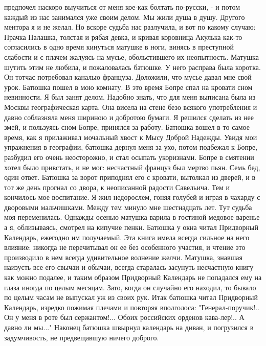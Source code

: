 предпочел наскоро выучиться от меня  кое-как  болтать  по-русски, -  и потом
каждый  из нас  занимался  уже своим делом.  Мы жили  душа  в  душу. Другого
ментора я  и  не  желал. Но вскоре судьба нас разлучила,  и  вот  по  какому
случаю:
Прачка Палашка,  толстая  и  рябая девка,  и  кривая  коровница Акулька
как-то согласились в одно время кинуться матушке в ноги, винясь в преступной
слабости и с плачем жалуясь на мусье,  обольстившего их неопытность. Матушка
шутить этим не любила, и пожаловалась батюшке. У него расправа была коротка.
Он тотчас потребовал каналью француза. Доложили,  что  мусье давал  мне свой
урок. Батюшка пошел в мою комнату. В  это время Бопре  спал  на кровати сном
невинности. Я был занят делом.  Надобно знать, что для меня выписана была из
Москвы географическая карта. Она висела на стене безо всякого употребления и
давно соблазняла меня шириною  и добротою бумаги.  Я решился  сделать из нее
змей, и пользуясь  сном Бопре, принялся за работу. Батюшка вошел  в то самое
время,  как я прилаживал мочальный  хвост к  Мысу Доброй  Надежды. Увидя мои
упражнения  в географии, батюшка дернул меня за ухо, потом подбежал к Бопре,
разбудил  его очень неосторожно, и стал осыпать укоризнами. Бопре в смятении
хотел было привстать, и не  мог: несчастный  француз был мертво  пьян.  Семь
бед, один  ответ. Батюшка  за  ворот приподнял  его  с кровати, вытолкал  из
дверей, и в тот  же  день прогнал со двора, к неописанной радости Савельича.
Тем и кончилось мое воспитание.
Я  жил  недорослем,  гоняя  голубей  и  играя  в  чахарду  с  дворовыми
мальчишками.  Между   тем   минуло  мне  шестнадцать  лет.  Тут  судьба  моя
переменилась.
Однажды   осенью  матушка  варила  в  гостиной  медовое  варенье  а  я,
облизываясь, смотрел  на кипучие  пенки.  Батюшка  у  окна читал  Придворный
Календарь, ежегодно им получаемый.  Эта книга  имела  всегда сильное на него
влияние: никогда  не перечитывал он ее без особенного участия, и  чтение это
производило  в нем  всегда  удивительное волнение  желчи.  Матушка,  знавшая
наизусть все его свычаи и обычаи, всегда старалась засунуть несчастную книгу
как можно подалее, и таким образом Придворный Календарь  не попадался ему на
глаза  иногда по  целым  месяцам. Зато,  когда он случайно  его находил,  то
бывало по  целым часам  не  выпускал  уж  из своих рук. Итак  батюшка  читал
Придворный  Календарь,  изредко  пожимая  плечами  и   повторяя  вполголоса:
"Генерал-поручик!.. Он  у  меня  в роте  был сержантом!... Обоих  российских
орденов кава-лер!.. А давно  ли мы..." Наконец батюшка швырнул  календарь на
диван, и погрузился в задумчивость, не предвещавшую ничего доброго.
